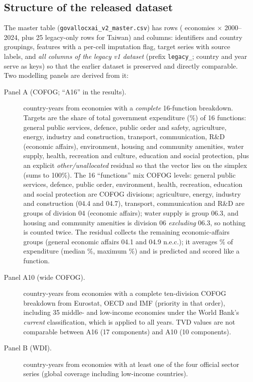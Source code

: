 \subsection{Structure of the released dataset}
The master table (\texttt{govallocxai\_v2\_master.csv}) has \NMasterRows{} rows (\NMasterCountries{} economies $\times$ 2000--2024, plus 25 legacy-only rows for Taiwan) and \NMasterCols{} columns: identifiers and country groupings, \NFeatNum{} features with a per-cell imputation flag, target series with source labels, and \emph{all columns of the legacy v1 dataset} (prefix \texttt{legacy\_}; country and year serve as keys) so that the earlier dataset is preserved and directly comparable. Two modelling panels are derived from it:
\begin{description}
\item[Panel A (COFOG; ``A16'' in the results).] \NCofogRows{} country-years from \NCofogCountries{} economies with a \emph{complete} 16-function breakdown. Targets are the share of total government expenditure (\%) of 16 functions: general public services, defence, public order and safety, agriculture, energy, industry and construction, transport, communication, R\&D (economic affairs), environment, housing and community amenities, water supply, health, recreation and culture, education and social protection, plus an explicit \emph{other/unallocated} residual so that the vector lies on the simplex (sums to 100\%). The 16 ``functions'' mix COFOG levels: general public services, defence, public order, environment, health, recreation, education and social protection are COFOG divisions; agriculture, energy, industry and construction (04.4 and 04.7), transport, communication and R\&D are groups of division 04 (economic affairs); water supply is group 06.3, and housing and community amenities is division 06 \emph{excluding} 06.3, so nothing is counted twice. The residual collects the remaining economic-affairs groups (general economic affairs 04.1 and 04.9 n.e.c.); it averages \ResidualMean\% of expenditure (median \ResidualMedian\%, maximum \ResidualMax\%) and is predicted and scored like a function.
\item[Panel A10 (wide COFOG).] \NTenRows{} country-years from \NTenEcon{} economies with a complete ten-division COFOG breakdown from Eurostat, OECD and IMF (priority in that order), including 35 middle- and low-income economies under the World Bank's \emph{current} classification, which is applied to all years. TVD values are not comparable between A16 (17 components) and A10 (10 components).
\item[Panel B (WDI).] \NWdiRows{} country-years from \NWdiCountries{} economies with at least one of the four official sector series (global coverage including low-income countries).
\end{description}
